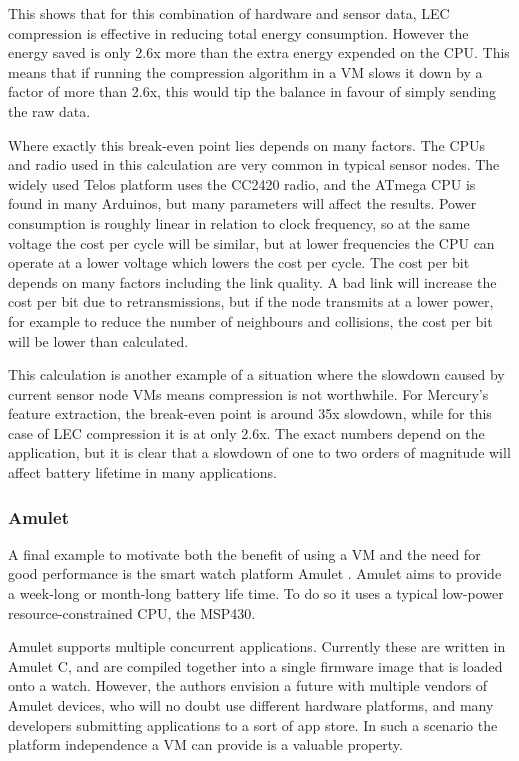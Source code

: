This shows that for this combination of hardware and sensor data, LEC compression is effective in reducing total energy consumption. However the energy saved is only 2.6x more than the extra energy expended on the CPU. This means that if running the compression algorithm in a VM slows it down by a factor of more than 2.6x, this would tip the balance in favour of simply sending the raw data.

Where exactly this break-even point lies depends on many factors. The CPUs and radio used in this calculation are very common in typical sensor nodes. The widely used Telos platform \cite{Polastre:2005ut} uses the CC2420 radio, and the ATmega CPU is found in many Arduinos, but many parameters will affect the results. Power consumption is roughly linear in relation to clock frequency, so at the same voltage the cost per cycle will be similar, but at lower frequencies the CPU can operate at a lower voltage which lowers the cost per cycle. The cost per bit depends on many factors including the link quality. A bad link will increase the cost per bit due to retransmissions, but if the node transmits at a lower power, for example to reduce the number of neighbours and collisions, the cost per bit will be lower than calculated.

This calculation is another example of a situation where the slowdown caused by current sensor node VMs means compression is not worthwhile. For Mercury's feature extraction, the break-even point is around 35x slowdown, while for this case of LEC compression it is at only 2.6x. The exact numbers depend on the application, but it is clear that a slowdown of one to two orders of magnitude will affect battery lifetime in many applications.

\subsubsection{Amulet}
A final example to motivate both the benefit of using a VM and the need for good performance is the smart watch platform Amulet \cite{Hester:2016je}. Amulet aims to provide a week-long or month-long battery life time. To do so it uses a typical low-power resource-constrained CPU, the MSP430.

Amulet supports multiple concurrent applications. Currently these are written in Amulet C, and are compiled together into a single firmware image that is loaded onto a watch. However, the authors envision a future with multiple vendors of Amulet devices, who will no doubt use different hardware platforms, and many developers submitting applications to a sort of app store. In such a scenario the platform independence a VM can provide is a valuable property.

